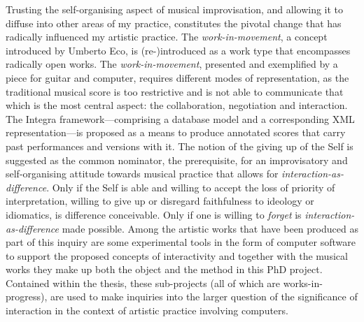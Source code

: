 Trusting the self-organising aspect of musical improvisation, and allowing it to diffuse into other areas of my practice, constitutes the pivotal change that has radically influenced my artistic practice. The \emph{work-in-movement}, a concept introduced by Umberto Eco, is (re-)introduced as a work type that encompasses radically open works. The \emph{work-in-movement}, presented and exemplified by a piece for guitar and computer, requires different modes of representation, as the traditional musical score is too restrictive and is not able to communicate that which is the most central aspect: the collaboration, negotiation and interaction. The Integra framework---comprising a database model and a corresponding XML representation---is proposed as a means to produce annotated scores that carry past performances and versions with it. The notion of the giving up of the Self is suggested as the common nominator, the prerequisite, for an improvisatory and self-organising attitude towards musical practice that allows for \emph{interaction-as-difference}. Only if the Self is able and willing to accept the loss of priority of interpretation, willing to give up or disregard faithfulness to ideology or idiomatics, is difference conceivable. Only if one is willing to \emph{forget} is \emph{interaction-as-difference} made possible. Among the artistic works that have been produced as part of this inquiry are some experimental tools in the form of computer software to support the proposed concepts of interactivity and together with the musical works they make up both the object and the method in this PhD project. Contained within the thesis, these sub-projects (all of which are works-in-progress), are used to make inquiries into the larger question of the significance of interaction in the context of artistic practice involving computers.

